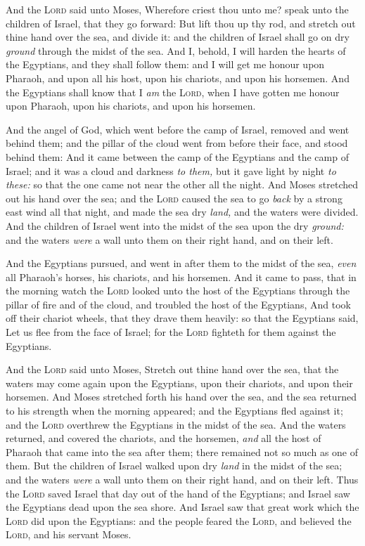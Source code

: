 \documentclass[11pt,letterpaper,oneside]{memoir}
\begin{document}
And the \textsc{Lord} said unto Moses, Wherefore criest thou unto me?
speak unto the children of Israel, that they go forward: But lift thou
up thy rod, and stretch out thine hand over the sea, and divide it: and
the children of Israel shall go on dry \emph{ground} through the midst
of the sea. And I, behold, I will harden the hearts of the Egyptians,
and they shall follow them: and I will get me honour upon Pharaoh, and
upon all his host, upon his chariots, and upon his horsemen. And the
Egyptians shall know that I \emph{am} the \textsc{Lord}, when I have
gotten me honour upon Pharaoh, upon his chariots, and upon his horsemen.

And the angel of God, which went before the camp of Israel, removed and
went behind them; and the pillar of the cloud went from before their
face, and stood behind them: And it came between the camp of the
Egyptians and the camp of Israel; and it was a cloud and darkness
\emph{to them,} but it gave light by night \emph{to these:} so that the
one came not near the other all the night. And Moses stretched out his
hand over the sea; and the \textsc{Lord} caused the sea to go
\emph{back} by a strong east wind all that night, and made the sea dry
\emph{land,} and the waters were divided. And the children of Israel
went into the midst of the sea upon the dry \emph{ground:} and the
waters \emph{were} a wall unto them on their right hand, and on their
left.

And the Egyptians pursued, and went in after them to the midst of the
sea, \emph{even} all Pharaoh's horses, his chariots, and his horsemen.
And it came to pass, that in the morning watch the \textsc{Lord} looked
unto the host of the Egyptians through the pillar of fire and of the
cloud, and troubled the host of the Egyptians, And took off their
chariot wheels, that they drave them heavily: so that the Egyptians
said, Let us flee from the face of Israel; for the \textsc{Lord}
fighteth for them against the Egyptians.

And the \textsc{Lord} said unto Moses, Stretch out thine hand over the
sea, that the waters may come again upon the Egyptians, upon their
chariots, and upon their horsemen. And Moses stretched forth his hand
over the sea, and the sea returned to his strength when the morning
appeared; and the Egyptians fled against it; and the \textsc{Lord}
overthrew the Egyptians in the midst of the sea. And the waters
returned, and covered the chariots, and the horsemen, \emph{and} all the
host of Pharaoh that came into the sea after them; there remained not so
much as one of them. But the children of Israel walked upon dry
\emph{land} in the midst of the sea; and the waters \emph{were} a wall
unto them on their right hand, and on their left. Thus the \textsc{Lord}
saved Israel that day out of the hand of the Egyptians; and Israel saw
the Egyptians dead upon the sea shore. And Israel saw that great work
which the \textsc{Lord} did upon the Egyptians: and the people feared
the \textsc{Lord}, and believed the \textsc{Lord}, and his servant
Moses.
\end{document}
